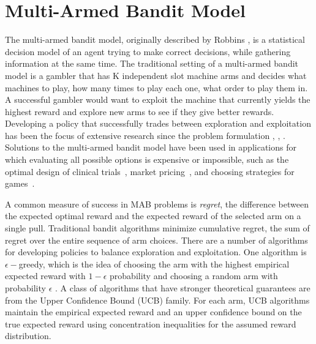 \documentclass[letterpaper, 10 pt, conference]{ieeeconf}  %
\begin{document}
\section{Multi-Armed Bandit Model}
The multi-armed bandit model, originally described by Robbins \cite{robbins1985some}, is a statistical decision model of an agent trying to make correct decisions, while gathering information at the same time.
The traditional setting of a multi-armed bandit model is a gambler that has K independent slot machine arms and decides what machines to play, how many times to play each one, what order to play them in.
A successful gambler would want to exploit the machine that currently yields the highest reward and explore new arms to see if they give better rewards.
Developing a policy that successfully trades between exploration and exploitation has been the focus of extensive research since the problem formulation \cite{bubeck2009pure}, \cite{robbins1952some}, \cite{bergemann2006bandit}. Solutions to the multi-armed bandit model have been used in applications for which evaluating all possible options is expensive or impossible, such as the optimal design of clinical trials~\cite{simon1989optimal}, market pricing~\cite{rothschild1974two}, and choosing strategies for games~\cite{st2012online}. 

A common measure of success in MAB problems is {\it regret}, the difference between the expected optimal reward and the expected reward of the selected arm on a single pull.
Traditional bandit algorithms minimize cumulative regret,  the sum of regret over the entire sequence of arm choices. There are a number of algorithms for developing policies to balance exploration and exploitation.
One algorithm is $\epsilon-$greedy, which is the idea of choosing the arm with the highest empirical expected reward with $1-\epsilon$ probability and choosing a random arm with probability $\epsilon$ \cite{barto1998reinforcement}.
A class of algorithms that have stronger theoretical guarantees are from the Upper Confidence Bound (UCB) family.
For each arm, UCB algorithms maintain the empirical expected reward and an upper confidence bound on the true expected reward using concentration inequalities for the assumed reward distribution.

\end{document}
